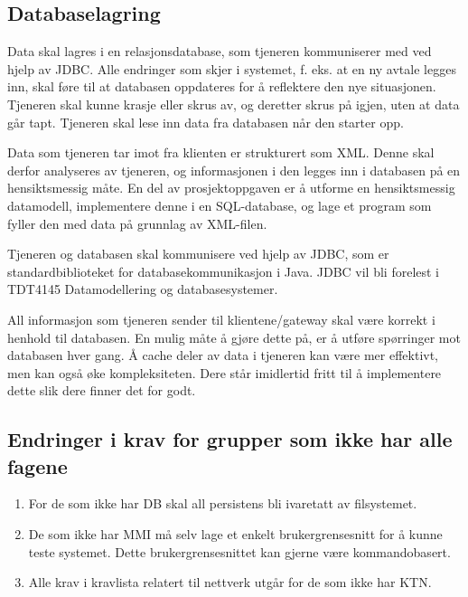 \documentclass[a4paper]{scrartcl}
\begin{document}
\subsection{Databaselagring}

Data skal lagres i en relasjonsdatabase, som tjeneren kommuniserer med ved hjelp av JDBC. Alle endringer som skjer i systemet, f. eks. at  en ny avtale legges inn, skal føre til at databasen oppdateres for å reflektere den nye situasjonen. Tjeneren skal kunne krasje eller skrus av, og deretter skrus på igjen, uten at data går tapt. Tjeneren skal lese inn data fra databasen når den starter opp.

Data som tjeneren tar imot fra klienten er strukturert som XML. Denne skal derfor analyseres av tjeneren, og informasjonen i den legges inn i databasen på en hensiktsmessig måte. En del av prosjektoppgaven er å utforme en hensiktsmessig datamodell, implementere denne i en SQL-database, og lage et program som fyller den med data på grunnlag av XML-filen. 

Tjeneren og databasen skal kommunisere ved hjelp av JDBC, som er standardbiblioteket for databasekommunikasjon i Java. JDBC vil bli forelest i TDT4145 Datamodellering og databasesystemer.

All informasjon som tjeneren sender til klientene/gateway skal være korrekt i henhold til databasen. En mulig måte å gjøre dette på, er å utføre spørringer mot databasen hver gang. Å cache deler av data i tjeneren kan være mer effektivt, men kan også øke kompleksiteten. Dere står imidlertid fritt til å implementere dette slik dere finner det for godt.

\subsection{Endringer i krav for grupper som ikke har alle fagene}

\begin{enumerate}

\item
For de som ikke har DB skal all persistens bli ivaretatt av filsystemet. 

\item
De som ikke har MMI må selv lage et enkelt brukergrensesnitt for å kunne teste systemet. Dette brukergrensesnittet kan gjerne være kommandobasert. 

\item
Alle krav i kravlista relatert til nettverk utgår for de som ikke har KTN. 

\end{enumerate}
\end{document}
